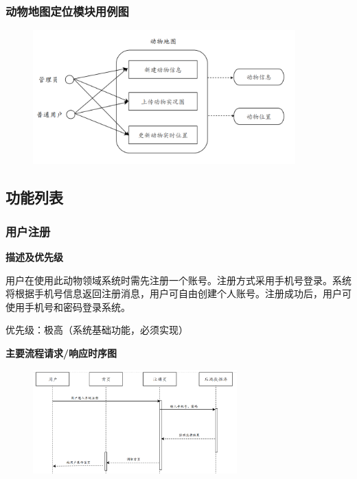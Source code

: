 \documentclass[12pt,a4paper,UTF8]{article}
\begin{document}
\subsubsection{动物地图定位模块用例图}

\begin{figure}[H]
  \centering
  \includegraphics[width=0.9\textwidth]{figures/case3.png}
\end{figure}

\subsection{功能列表}

\subsubsection{用户注册}

\noindent\textbf{描述及优先级}

用户在使用此动物领域系统时需先注册一个账号。注册方式采用手机号登录。系统将根据手机号信息返回注册消息，用户可自由创建个人账号。注册成功后，用户可使用手机号和密码登录系统。

优先级：极高（系统基础功能，必须实现）

\noindent\textbf{主要流程请求/响应时序图}

\begin{figure}[H]
  \centering
  \includegraphics[width=0.7\textwidth]{figures/use321.png}
\end{figure}
\end{document}
